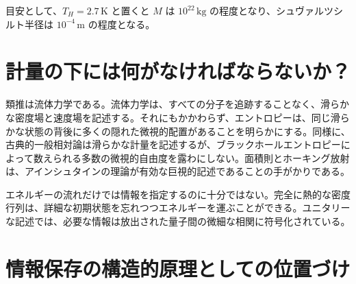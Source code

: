 目安として、\(T_H=2.7\,\mathrm{K}\) と置くと \(M\) は \(10^{22}\,\mathrm{kg}\) の程度となり、シュヴァルツシルト半径は \(10^{-4}\,\mathrm{m}\) の程度となる。

\section{計量の下には何がなければならないか？}

\begin{classroomqa}
\end{classroomqa}

類推は流体力学である。流体力学は、すべての分子を追跡することなく、滑らかな密度場と速度場を記述する。それにもかかわらず、エントロピーは、同じ滑らかな状態の背後に多くの隠れた微視的配置があることを明らかにする。同様に、古典的一般相対論は滑らかな計量を記述するが、ブラックホールエントロピーによって数えられる多数の微視的自由度を露わにしない。面積則とホーキング放射は、アインシュタインの理論が有効な巨視的記述であることの手がかりである。

\begin{classroomqa}
\end{classroomqa}

エネルギーの流れだけでは情報を指定するのに十分ではない。完全に熱的な密度行列は、詳細な初期状態を忘れつつエネルギーを運ぶことができる。ユニタリーな記述では、必要な情報は放出された量子間の微細な相関に符号化されている。

\section{情報保存の構造的原理としての位置づけ}

